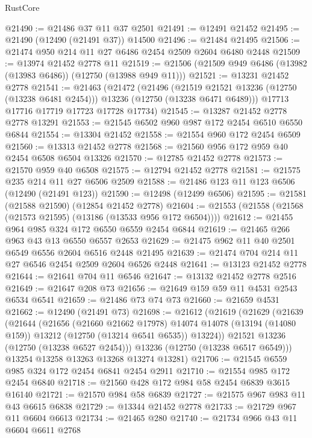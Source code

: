 \begin{lexlean}{RustCore}
\begin{coremodule}
@21490 := @21486 @37 @11 @37 @2501
@21491 := @12491 @21452
@21495 := @21490 (@12490 (@21491 @37)) @14500
@21496 := @21484 @21495
@21506 := @21474 @950 @214 @11 @27 @6486 @2454 @2509 @2604 @6480 @2448
@21509 := @13974 @21452 @2778 @11
@21519 := @21506 (@21509 @949 @6486 (@13982 (@13983 @6486)) (@12750 (@13988 @949 @11)))
@21521 := @13231 @21452 @2778
@21541 := @21463
    (@21472
      (@21496
        (@21519 @21521 @13236 (@12750 (@13238 @6481 @2454)))
        @13236
        (@12750 (@13238 @6471 @6489)))
      @17713
      @17716
      @17719
      @17723
      @17728
      @17734)
@21545 := @13287 @21452 @2778 @2778 @13291
@21553 := @21545 @6502 @960 @987 @172 @2454 @6510 @6550 @6844
@21554 := @13304 @21452
@21558 := @21554 @960 @172 @2454 @6509
@21560 := @13313 @21452 @2778
@21568 := @21560 @956 @172 @959 @40 @2454 @6508 @6504 @13326
@21570 := @12785 @21452 @2778
@21573 := @21570 @959 @40 @6508
@21575 := @12794 @21452 @2778
@21581 := @21575 @235 @214 @11 @27 @6506 @2509
@21588 := @21486 @123 @11 @123 @6506 (@12490 (@21491 @123))
@21590 := @12498 (@12499 @6506)
@21595 := @21581 (@21588 @21590) (@12854 @21452 @2778)
@21604 := @21553 (@21558 (@21568 (@21573 @21595) (@13186 (@13533 @956 @172 @6504))))
@21612 := @21455 @964 @985 @324 @172 @6550 @6559 @2454 @6844
@21619 := @21465 @266 @963 @43 @13 @6550 @6557 @2653
@21629 := @21475 @962 @11 @40 @2501 @6549 @6556 @2604 @6516 @2448 @21495
@21639 := @21474 @704 @214 @11 @27 @6546 @2454 @2509 @2604 @6526 @2448
@21641 := @13123 @21452 @2778
@21644 := @21641 @704 @11 @6546
@21647 := @13132 @21452 @2778 @2516
@21649 := @21647 @208 @73
@21656 := @21649 @159 @59 @11 @4531 @2543 @6534 @6541
@21659 := @21486 @73 @74 @73
@21660 := @21659 @4531
@21662 := @12490 (@21491 @73)
@21698 := @21612
    (@21619
      (@21629
        (@21639
          (@21644
            (@21656
              (@21660 @21662 @17978)
              @14074
              @14078
              (@13194 (@14080 @159))
              @13212
              (@12750 (@13214 @6541 @6535))
              @13224))
          @21521
          @13236
          (@12750 (@13238 @6527 @2454)))
        @13236
        (@12750 (@13238 @6517 @6549)))
      @13254
      @13258
      @13263
      @13268
      @13274
      @13281)
@21706 := @21545 @6559 @985 @324 @172 @2454 @6841 @2454 @2911
@21710 := @21554 @985 @172 @2454 @6840
@21718 := @21560 @428 @172 @984 @58 @2454 @6839 @3615 @16140
@21721 := @21570 @984 @58 @6839
@21727 := @21575 @967 @983 @11 @43 @6615 @6838
@21729 := @13344 @21452 @2778
@21733 := @21729 @967 @11 @6604 @6613
@21734 := @21465 @280
@21740 := @21734 @966 @43 @11 @6604 @6611 @2768

\end{coremodule}
\end{lexlean}
